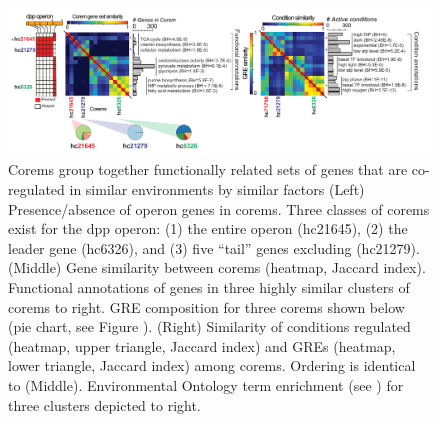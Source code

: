 \begin{figure}[hp]
\centering
\includegraphics[width=0.95\linewidth]{figures/dpp_heatmaps.pdf}
\caption[Alternate regulatory modes for \textit{dpp} operon predicted by corems]{\textbf{\textit{} } \DIFaddendFL Corems group together functionally related sets of genes that are co-regulated in similar environments by similar factors (Left) Presence/absence of \DIFdelbeginFL {}\DIFdelendFL \DIFaddbeginFL \textit{} \DIFaddendFL operon genes in corems. Three classes of corems exist for the dpp operon: (1) the entire operon (\eg hc21645), (2) the leader gene \DIFdelbeginFL {}\DIFdelendFL \DIFaddbeginFL \textit{} \DIFaddendFL (\eg hc6326), and (3) five ``tail'' genes excluding \DIFdelbeginFL {}\DIFdelendFL \DIFaddbeginFL \textit{} \DIFaddendFL (hc21279). (Middle) Gene similarity between corems (heatmap, Jaccard index). Functional annotations of genes in three highly similar clusters of corems to right. GRE composition for three corems shown below (pie chart, see Figure \DIFdelbeginFL {}\DIFdelendFL \DIFaddbeginFL \DIFaddFL{\ref{fig:corem_gres}}\DIFaddendFL ). (Right) Similarity of conditions regulated (heatmap, upper triangle, Jaccard index) and GREs (heatmap, lower triangle, Jaccard index) among corems. Ordering is identical to (Middle). Environmental Ontology term enrichment (see \DIFdelbeginFL {}\DIFdelendFL \DIFaddbeginFL {}\DIFaddendFL ) for three clusters depicted to right.\DIFdelbeginFL %
\DIFdelendFL \DIFaddbeginFL }
\label{fig:dpp_heatmaps}
\end{figure}

